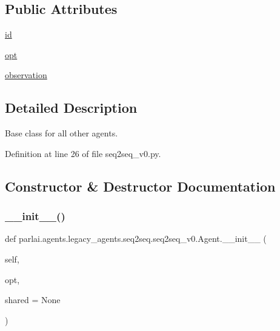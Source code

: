 \subsection*{Public Attributes}
\begin{DoxyCompactItemize}
\item 
\hyperlink{classparlai_1_1agents_1_1legacy__agents_1_1seq2seq_1_1seq2seq__v0_1_1Agent_a446e864fc95a310d508e3095c7f3d930}{id}
\item 
\hyperlink{classparlai_1_1agents_1_1legacy__agents_1_1seq2seq_1_1seq2seq__v0_1_1Agent_ae07383697f7232bb21cbd0a1c6e93389}{opt}
\item 
\hyperlink{classparlai_1_1agents_1_1legacy__agents_1_1seq2seq_1_1seq2seq__v0_1_1Agent_a6371fe160ef331078a794fc1d8b67371}{observation}
\end{DoxyCompactItemize}


\subsection{Detailed Description}
\begin{DoxyVerb}Base class for all other agents.
\end{DoxyVerb}
 

Definition at line 26 of file seq2seq\+\_\+v0.\+py.



\subsection{Constructor \& Destructor Documentation}
\mbox{\label{classparlai_1_1agents_1_1legacy__agents_1_1seq2seq_1_1seq2seq__v0_1_1Agent_ae84057ceae2e7cf0b5d6248b48596b76}} 
\subsubsection{\texorpdfstring{\+\_\+\+\_\+init\+\_\+\+\_\+()}{\_\_init\_\_()}}
{\footnotesize\ttfamily def parlai.\+agents.\+legacy\+\_\+agents.\+seq2seq.\+seq2seq\+\_\+v0.\+Agent.\+\_\+\+\_\+init\+\_\+\+\_\+ (\begin{DoxyParamCaption}\item[{}]{self,  }\item[{}]{opt,  }\item[{}]{shared = {\ttfamily None} }\end{DoxyParamCaption})}



